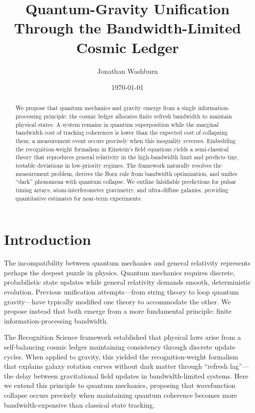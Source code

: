 \documentclass[twocolumn,prd,amsmath,amssymb,aps,superscriptaddress,nofootinbib]{revtex4-2}
\begin{document}
\title{Quantum-Gravity Unification Through the Bandwidth-Limited Cosmic Ledger}

\author{Jonathan Washburn}

\date{\today}

\begin{abstract}
We propose that quantum mechanics and gravity emerge from a single information-processing principle: the cosmic ledger allocates finite refresh bandwidth to maintain physical states. A system remains in quantum superposition while the marginal bandwidth cost of tracking coherences is lower than the expected cost of collapsing them; a measurement event occurs precisely when this inequality reverses. Embedding the recognition-weight formalism in Einstein's field equations yields a semi-classical theory that reproduces general relativity in the high-bandwidth limit and predicts tiny, testable deviations in low-priority regimes. The framework naturally resolves the measurement problem, derives the Born rule from bandwidth optimization, and unifies ``dark'' phenomena with quantum collapse. We outline falsifiable predictions for pulsar timing arrays, atom-interferometer gravimetry, and ultra-diffuse galaxies, providing quantitative estimates for near-term experiments.
\end{abstract}

\maketitle

\section{Introduction}
\label{sec:intro}

The incompatibility between quantum mechanics and general relativity represents perhaps the deepest puzzle in physics. Quantum mechanics requires discrete, probabilistic state updates while general relativity demands smooth, deterministic evolution. Previous unification attempts---from string theory to loop quantum gravity---have typically modified one theory to accommodate the other. We propose instead that both emerge from a more fundamental principle: finite information-processing bandwidth.

The Recognition Science framework established that physical laws arise from a self-balancing cosmic ledger maintaining consistency through discrete update cycles. When applied to gravity, this yielded the recognition-weight formalism that explains galaxy rotation curves without dark matter through ``refresh lag''---the delay between gravitational field updates in bandwidth-limited systems. Here we extend this principle to quantum mechanics, proposing that wavefunction collapse occurs precisely when maintaining quantum coherence becomes more bandwidth-expensive than classical state tracking.
\end{document}
